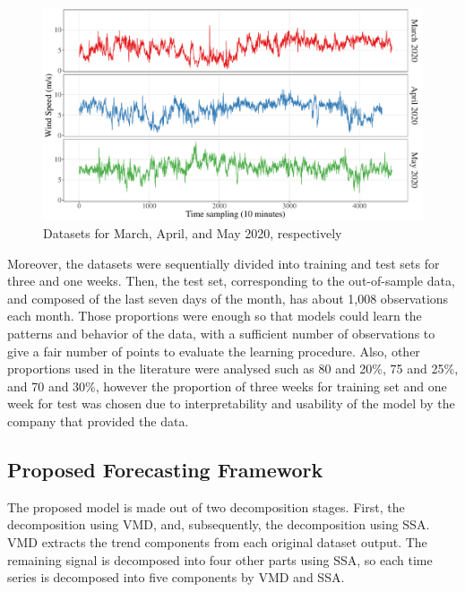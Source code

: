 \begin{figure}[htb!]
    \centering
    \includegraphics[width=\linewidth]{Media/cs3_datasets_plot.pdf}
    \caption{Datasets for March, April, and May 2020, respectively}
    \label{fig:datasets}
\end{figure}

Moreover, the datasets were sequentially divided into training and test sets for three and one weeks. Then, the test set, corresponding to the out-of-sample data, and composed of the last seven days of the month, has about 1,008 observations each month. Those proportions were enough so that models could learn the patterns and behavior of the data, with a sufficient number of observations to give a fair number of points to evaluate the learning procedure. Also, other proportions used in the literature were analysed such as 80 and 20\%, 75 and 25\%, and 70 and 30\%, however the proportion of three weeks for training set and one week for test was chosen due to interpretability and usability of the model by the company that provided the data.

\subsection{Proposed Forecasting Framework}

The proposed model is made out of two decomposition stages. First, the decomposition using \ac{VMD}, and, subsequently, the decomposition using \ac{SSA}. \ac{VMD} extracts the trend components from each original dataset output. The remaining signal is decomposed into four other parts using \ac{SSA}, so each time series is decomposed into five components by \ac{VMD} and \ac{SSA}.

